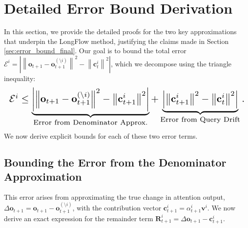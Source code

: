 \clearpage
\appendix


\section{Detailed Error Bound Derivation}
\label{app:full_error_bound}


In this section, we provide the detailed proofs for the two key approximations that underpin the LongFlow method, justifying the claims made in Section \ref{sec:error_bound_final}. Our goal is to bound the total error \( \mathcal{E}^i = \left| \left\| \mathbf{o}_{t+1} - \mathbf{o}_{t+1}^{(\setminus i)} \right\|^2 - \left\| \mathbf{c}_t^i \right\|^2 \right| \), which we decompose using the triangle inequality:
\begin{equation}
\resizebox{\columnwidth}{!}{$
    \mathcal{E}^i \le \underbrace{\left| \left\| \mathbf{o}_{t+1} - \mathbf{o}_{t+1}^{(\setminus i)} \right\|^2 - \left\| \mathbf{c}_{t+1}^i \right\|^2 \right|}_{\text{Error from Denominator Approx.}} + \underbrace{\left| \left\| \mathbf{c}_{t+1}^i \right\|^2 - \left\| \mathbf{c}_t^i \right\|^2 \right|}_{\text{Error from Query Drift}}.
$}
\end{equation}
We now derive explicit bounds for each of these two error terms.

\subsection{Bounding the Error from the Denominator Approximation}

This error arises from approximating the true change in attention output, \( \Delta\mathbf{o}_{t+1} = \mathbf{o}_{t+1} - \mathbf{o}_{t+1}^{(\setminus i)} \), with the contribution vector \( \mathbf{c}_{t+1}^i = \alpha_{t+1}^i \mathbf{v}^i \). We now derive an exact expression for the remainder term \( \mathbf{R}_{t+1}^i = \Delta\mathbf{o}_{t+1} - \mathbf{c}_{t+1}^i \).

